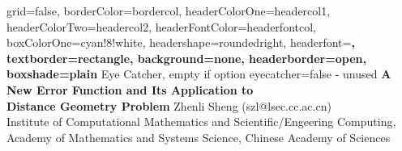 \documentclass[a0paper,portrait]{baposter}
\begin{document}
\begin{poster}{
	grid=false,
	borderColor=bordercol,
	headerColorOne=headercol1,
	headerColorTwo=headercol2,
	headerFontColor=headerfontcol,
	boxColorOne=cyan!8!white,
	headershape=roundedright,
	headerfont=\Large\sf\bf,
	textborder=rectangle,
	background=none,
	headerborder=open,
    boxshade=plain
}
{
	Eye Catcher, empty if option eyecatcher=false - unused
}
{\sf\bf
	A New Error Function and Its Application to \\Distance Geometry Problem
}
{
	\vspace{1mm} {\smaller Zhenli Sheng (szl@lsec.cc.ac.cn)\\
Institute of Computational Mathematics and Scientific/Engeering Computing, \\
Academy of Mathematics and Systems Science, Chinese Academy of Sciences}
}
{
\setlength\fboxsep{0pt}
\setlength\fboxrule{0.5pt}
}


\end{poster}
\end{document}
